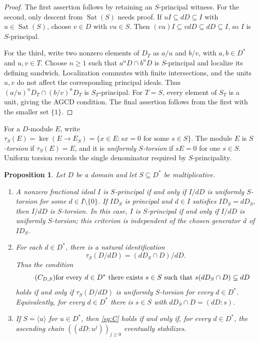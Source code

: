 \documentclass[11pt]{amsart}
\newtheorem{proposition}[theorem]{Proposition}
\theoremstyle{definition}
\theoremstyle{remark}
\DeclareMathOperator{\Sat}{Sat}
\begin{document}
\begin{proof}
The first assertion follows by retaining an $S$-principal witness.
For the second, only descent from $\Sat(S)$ needs proof.
If $uI\subseteq dD\subseteq I$ with $u\in\Sat(S)$, choose
$v\in D$ with $vu\in S$. Then
$(vu)I\subseteq vdD\subseteq dD\subseteq I$, so $I$ is
$S$-principal.

For the third, write two nonzero elements of $D_T$ as $a/u$ and
$b/v$, with $a,b\in D^\ast$ and $u,v\in T$. Choose
$n\geq1$ such that $a^nD\cap b^nD$ is $S$-principal and localize
its defining sandwich. Localization commutes with finite
intersections, and the units $u,v$ do not affect the corresponding
principal ideals. Thus
$(a/u)^nD_T\cap(b/v)^nD_T$ is $S_T$-principal.
For $T=S$, every element of $S_T$ is a unit, giving the AGCD
condition. The final assertion follows from the first with the
smaller set $\{1\}$.
\end{proof}

For a $D$-module $E$, write
$\tau_S(E)=\ker(E\longrightarrow E_S)
=\{x\in E:sx=0\text{ for some }s\in S\}$.
The module $E$ is \emph{$S$-torsion} if $\tau_S(E)=E$, and it is
\emph{uniformly $S$-torsion} if $sE=0$ for one $s\in S$.
Uniform torsion records the single denominator required by
$S$-principality.

\begin{proposition}\label{p:torsion-obstruction}
Let $D$ be a domain and let $S\subseteq D^\ast$ be multiplicative.
\begin{enumerate}
\item A nonzero fractional ideal $I$ is $S$-principal if and only
if $I/dD$ is uniformly $S$-torsion for some $d\in I\setminus\{0\}$.
If $ID_S$ is principal and $d\in I$ satisfies $ID_S=dD_S$, then
$I/dD$ is $S$-torsion. In this case, $I$ is $S$-principal if and
only if $I/dD$ is uniformly $S$-torsion; this criterion is
independent of the chosen generator $d$ of $ID_S$.
\item For each $d\in D^\ast$, there is a natural identification
\[
\tau_S(D/dD)=(dD_S\cap D)/dD.
\]
Thus the condition
\begin{equation}\tag{$C_{D,S}$}\label{eq:C}
\text{for every }d\in D^\ast\text{ there exists }s\in S
\text{ such that }s(dD_S\cap D)\subseteq dD
\end{equation}
holds if and only if $\tau_S(D/dD)$ is uniformly $S$-torsion
for every $d\in D^\ast$. Equivalently, for every $d\in D^\ast$
there is $s\in S$ with $dD_S\cap D=(dD:s)$.
\item If $S=\langle u\rangle$ for $u\in D^\ast$, then
\eqref{eq:C} holds if and only if, for every $d\in D^\ast$,
the ascending chain $((dD:u^j))_{j\geq0}$ eventually stabilizes.
\end{enumerate}
\end{proposition}
\end{document}

